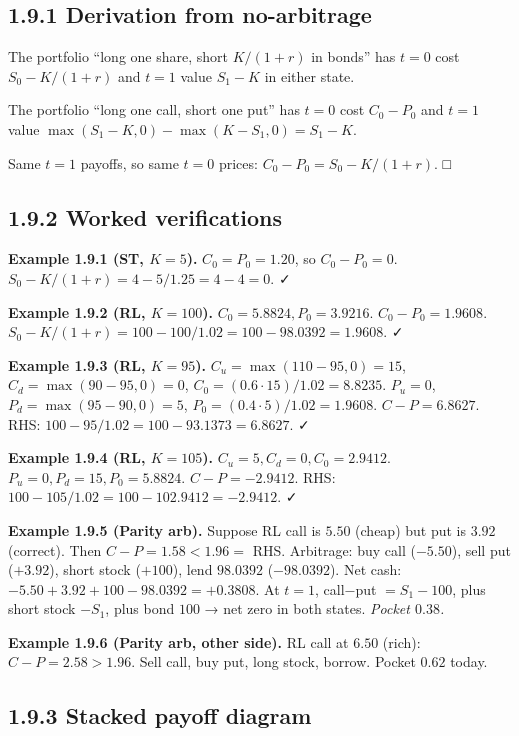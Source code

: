 \documentclass[
  10pt,
  twoside]{book}
\begin{document}
\subsection{1.9.1 Derivation from
no-arbitrage}\label{derivation-from-no-arbitrage}

The portfolio ``long one share, short \(K/(1+r)\) in bonds'' has \(t=0\)
cost \(S_0 - K/(1+r)\) and \(t=1\) value \(S_1 - K\) in either state.

The portfolio ``long one call, short one put'' has \(t=0\) cost
\(C_0-P_0\) and \(t=1\) value \(\max(S_1-K,0)-\max(K-S_1,0)=S_1-K\).

Same \(t=1\) payoffs, so same \(t=0\) prices:
\(C_0 - P_0 = S_0 - K/(1+r)\). □

\subsection{1.9.2 Worked verifications}\label{worked-verifications-1}

\textbf{Example 1.9.1 (ST, \(K=5\)).} \(C_0=P_0=1.20\), so
\(C_0-P_0=0\). \(S_0-K/(1+r) = 4 - 5/1.25 = 4 - 4 = 0\). ✓

\textbf{Example 1.9.2 (RL, \(K=100\)).} \(C_0=5.8824, P_0=3.9216\).
\(C_0-P_0=1.9608\).
\(S_0-K/(1+r) = 100 - 100/1.02 = 100 - 98.0392 = 1.9608\). ✓

\textbf{Example 1.9.3 (RL, \(K=95\)).} \(C_u=\max(110-95,0)=15\),
\(C_d=\max(90-95,0)=0\), \(C_0=(0.6\cdot 15)/1.02 = 8.8235\). \(P_u=0\),
\(P_d=\max(95-90,0)=5\), \(P_0=(0.4\cdot 5)/1.02 = 1.9608\).
\(C-P=6.8627\). RHS: \(100-95/1.02=100-93.1373=6.8627\). ✓

\textbf{Example 1.9.4 (RL, \(K=105\)).} \(C_u=5, C_d=0, C_0=2.9412\).
\(P_u=0, P_d=15, P_0=5.8824\). \(C-P=-2.9412\). RHS:
\(100-105/1.02=100-102.9412=-2.9412\). ✓

\textbf{Example 1.9.5 (Parity arb).} Suppose RL call is \(5.50\) (cheap)
but put is \(3.92\) (correct). Then \(C-P=1.58 < 1.96 =\) RHS.
Arbitrage: buy call (\(-5.50\)), sell put (\(+3.92\)), short stock
(\(+100\)), lend \(98.0392\) (\(-98.0392\)). Net cash:
\(-5.50+3.92+100-98.0392 = +0.3808\). At \(t=1\), call\(-\)put
\(=S_1-100\), plus short stock \(-S_1\), plus bond \(100\) → net zero in
both states. \emph{Pocket \(0.38\).}

\textbf{Example 1.9.6 (Parity arb, other side).} RL call at \(6.50\)
(rich): \(C-P=2.58>1.96\). Sell call, buy put, long stock, borrow.
Pocket \(0.62\) today.

\subsection{1.9.3 Stacked payoff diagram}\label{stacked-payoff-diagram}
\end{document}
